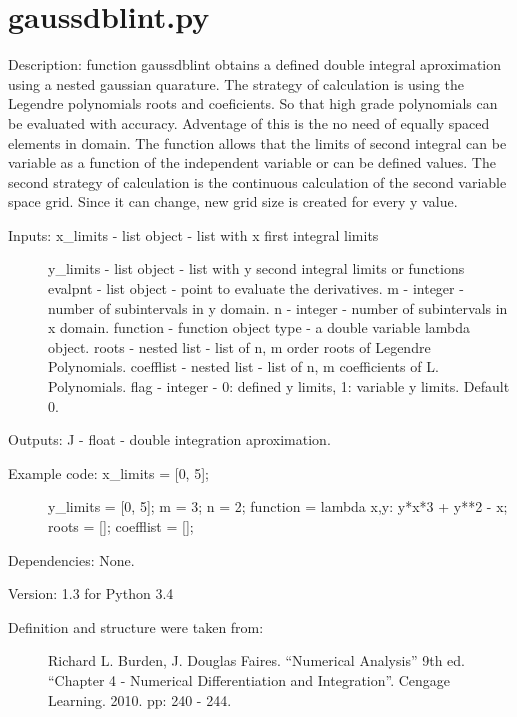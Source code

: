 \documentclass[letterpaper,10pt,oneside]{sphinxmanual}
\theoremstyle{plain}%
\theoremstyle{definition}%
\theoremstyle{remark}%
\begin{document}
\section{gaussdblint.py}
\label{code:module-gaussdblint}\label{code:gaussdblint-py}
Description: function gaussdblint obtains a defined double integral 
aproximation using a nested gaussian quarature. The strategy of calculation
is using the Legendre polynomials roots and coeficients. So that high grade 
polynomials can be evaluated with accuracy. Adventage of this is the no
need of equally spaced elements in domain. The function allows that the
limits of second integral can be variable as a function of the independent
variable or can be defined values. The second strategy of calculation is
the continuous calculation of the second variable space grid. Since
it can change, new grid size is created for every y value.
\begin{description}
\item[{Inputs: x\_limits - list object - list with x first integral limits}] \leavevmode
y\_limits - list object - list with y second integral limits or functions
evalpnt - list object - point to evaluate the derivatives.
m - integer - number of subintervals in y domain.
n - integer - number of subintervals in x domain.
function - function object type - a double variable lambda object.
roots - nested list - list of n, m order roots of Legendre Polynomials.
coefflist - nested list - list of n, m coefficients of L. Polynomials.
flag - integer - 0: defined y limits, 1: variable y limits. Default 0.

\end{description}

Outputs: J - float - double integration aproximation.
\begin{description}
\item[{Example code: x\_limits = {[}0, 5{]};}] \leavevmode
y\_limits = {[}0, 5{]};
m = 3;
n = 2;
function = lambda x,y: y*x*3 + y**2 - x;
roots = {[}{]};
coefflist = {[}{]};

\end{description}

Dependencies: None.

Version: 1.3 for Python 3.4
\begin{description}
\item[{Definition and structure were taken from:}] \leavevmode
Richard L. Burden, J. Douglas Faires. ``Numerical Analysis'' 9th ed.
``Chapter 4 - Numerical Differentiation and Integration''. 
Cengage Learning. 2010. pp: 240 - 244.

\end{description}
\end{document}
